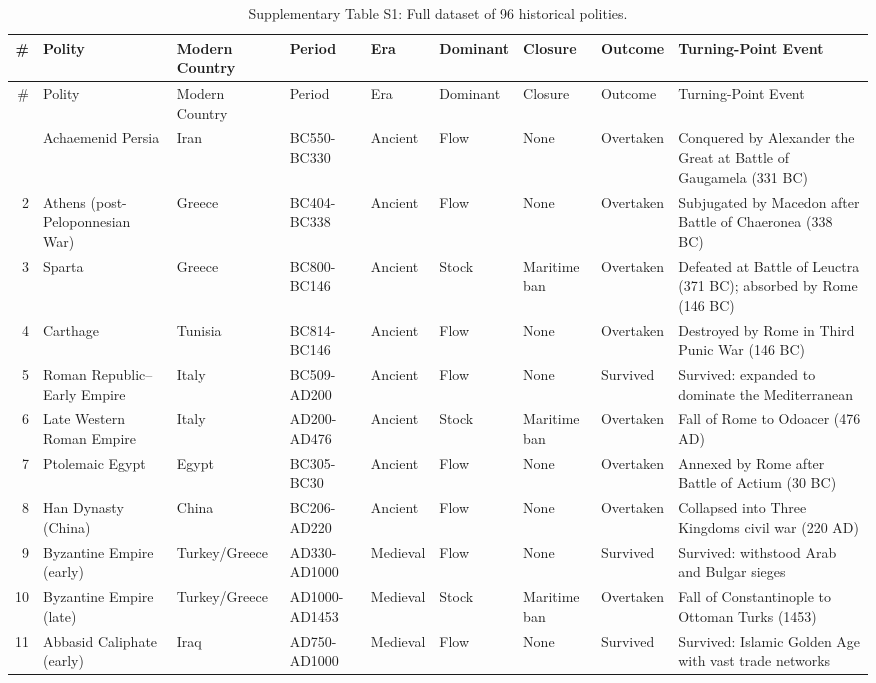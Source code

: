 \documentclass[11pt]{article}
\begin{document}
\footnotesize
\begin{longtable}{rlllllllp{6cm}}
\caption{Supplementary Table S1: Full dataset of 96 historical polities.} \\
\toprule
\# & Polity & Modern Country & Period & Era & Dominant & Closure & Outcome & Turning-Point Event \\
\midrule
\endfirsthead
\toprule
\# & Polity & Modern Country & Period & Era & Dominant & Closure & Outcome & Turning-Point Event \\
\midrule
\endhead
\midrule
\endfoot
\bottomrule
\endlastfoot
1 & Achaemenid Persia & Iran & BC550-BC330 & Ancient & Flow & None & Overtaken & Conquered by Alexander the Great at Battle of Gaugamela (331 BC) \\
2 & Athens (post-Peloponnesian War) & Greece & BC404-BC338 & Ancient & Flow & None & Overtaken & Subjugated by Macedon after Battle of Chaeronea (338 BC) \\
3 & Sparta & Greece & BC800-BC146 & Ancient & Stock & Maritime ban & Overtaken & Defeated at Battle of Leuctra (371 BC); absorbed by Rome (146 BC) \\
4 & Carthage & Tunisia & BC814-BC146 & Ancient & Flow & None & Overtaken & Destroyed by Rome in Third Punic War (146 BC) \\
5 & Roman Republic--Early Empire & Italy & BC509-AD200 & Ancient & Flow & None & Survived & Survived: expanded to dominate the Mediterranean \\
6 & Late Western Roman Empire & Italy & AD200-AD476 & Ancient & Stock & Maritime ban & Overtaken & Fall of Rome to Odoacer (476 AD) \\
7 & Ptolemaic Egypt & Egypt & BC305-BC30 & Ancient & Flow & None & Overtaken & Annexed by Rome after Battle of Actium (30 BC) \\
8 & Han Dynasty (China) & China & BC206-AD220 & Ancient & Flow & None & Overtaken & Collapsed into Three Kingdoms civil war (220 AD) \\
9 & Byzantine Empire (early) & Turkey/Greece & AD330-AD1000 & Medieval & Flow & None & Survived & Survived: withstood Arab and Bulgar sieges \\
10 & Byzantine Empire (late) & Turkey/Greece & AD1000-AD1453 & Medieval & Stock & Maritime ban & Overtaken & Fall of Constantinople to Ottoman Turks (1453) \\
11 & Abbasid Caliphate (early) & Iraq & AD750-AD1000 & Medieval & Flow & None & Survived & Survived: Islamic Golden Age with vast trade networks \\

\end{longtable}
\end{document}
